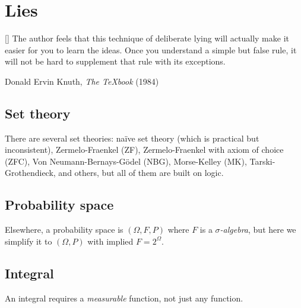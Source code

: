 \chapter{Lies}

\epigraph{
    [\textellipsis] The author feels that this technique of deliberate lying will actually make it easier for you to learn the ideas.
Once you understand a simple but false rule, it will not be hard to supplement that rule with its exceptions.
}{Donald Ervin Knuth, \emph{The \TeX{}book} (1984)}

\section{Set theory}

%
There are several set theories:
na\"ive set theory (which is practical but inconsistent),
Zermelo-Fraenkel (ZF),
Zermelo-Fraenkel with axiom of choice (ZFC),
Von Neumann-Bernays-G\"odel (NBG),
Morse-Kelley (MK),
Tarski-Grothendieck,
and others,
but all of them are built on logic.

\section{Probability space}

%
Elsewhere, a probability space is \((\Omega,F,P)\) where \(F\) is a \emph{\(\sigma\)-algebra},
but here we simplify it to \((\Omega,P)\) with implied \(F = 2^\Omega\).

\section{Integral}

%
%
%
An integral requires a \emph{measurable} function, not just any function.
